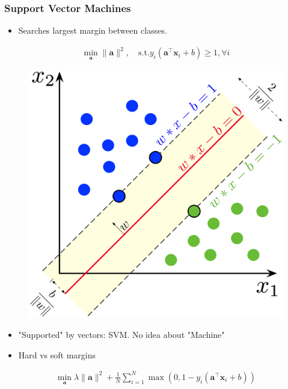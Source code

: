 \documentclass[a4,xcolor=dvipsnames]{beamer}
\def\a{\mathbf{a}}
\def\x{\mathbf{x}}
\begin{document}
\begin{frame}
    \frametitle{Support Vector Machines}
\begin{itemize}
    \item Searches largest margin between classes.
\end{itemize}
\begin{gather*}
    \min_{\a} \|\a\|^2, \quad \text{s.t.} y_i(\a^\top\x_i+b)\geq 1, \forall i
\end{gather*}
\begin{figure}[H]
    \centering
    \includegraphics[width=.5\textwidth]{SVM_margin.png}
\end{figure}
\begin{itemize}
    \item "Supported" by vectors: SVM. No idea about "Machine"
    \item Hard vs soft margins
\end{itemize}
\begin{gather*}
    \min_{\a} \lambda\|\a\|^2+\frac{1}{N}\sum_{i=1}^N \max(0, 1-y_i(\a^\top\x_i+b))
\end{gather*}
\end{frame}
\end{document}
